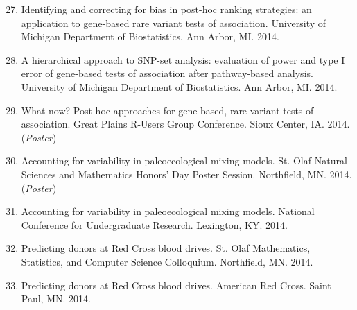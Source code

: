 \documentclass[margin]{res}
\newenvironment{benumerate}[1]{
    \let\oldItem\item
    \def\item{\addtocounter{enumi}{-2}\oldItem}
    
    \begin{enumerate}
    \setcounter{enumi}{#1}
    \addtocounter{enumi}{1}
}{
    \end{enumerate}
}
\begin{document}
\begin{resume}
\begin{benumerate}{26}
\item %
Identifying and correcting for bias in post-hoc ranking strategies: an application to gene-based rare variant tests of association. University of Michigan Department of Biostatistics. Ann Arbor, MI. 2014.

\item %
A hierarchical approach to SNP-set analysis: evaluation of power and type I error of gene-based tests of association after pathway-based analysis. University of Michigan Department of Biostatistics. Ann Arbor, MI. 2014.


\item %
What now? Post-hoc approaches for gene-based, rare variant tests of association. Great Plains R-Users Group Conference. Sioux Center, IA. 2014. (\textit{Poster})

\item %
Accounting for variability in paleoecological mixing models. St. Olaf Natural Sciences and Mathematics Honors’ Day Poster Session. Northfield, MN. 2014. (\textit{Poster})


\item %
Accounting for variability in paleoecological mixing models. National Conference for Undergraduate Research. Lexington, KY. 2014.

\item %
Predicting donors at Red Cross blood drives. St. Olaf Mathematics, Statistics, and Computer Science Colloquium. Northfield, MN. 2014.

\item %
Predicting donors at Red Cross blood drives. American Red Cross. Saint Paul, MN. 2014.


\end{benumerate}
\end{resume}
\end{document}

